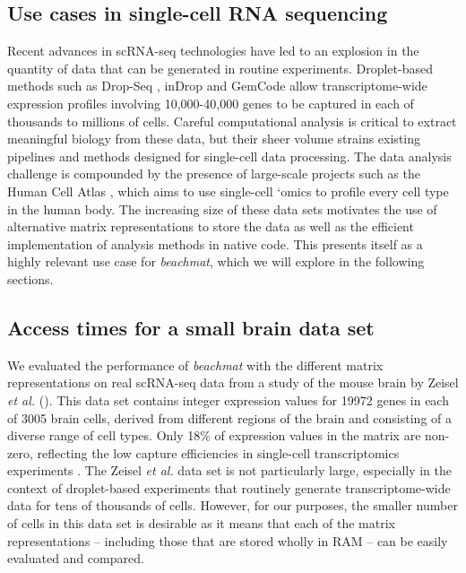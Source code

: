 \documentclass[10pt,letterpaper]{article}
\newcommand{\beachmat}{\textit{beachmat}}
\begin{document}
\subsection*{Use cases in single-cell RNA sequencing}
Recent advances in scRNA-seq technologies have led to an explosion in the quantity of data that can be generated in routine experiments.
Droplet-based methods such as Drop-Seq \cite{macosko2015highly}, inDrop \cite{klein2015droplet} and GemCode \cite{zheng2017massively} allow transcriptome-wide expression profiles involving 10,000-40,000 genes to be captured in each of thousands to millions of cells.
Careful computational analysis is critical to extract meaningful biology from these data, but their sheer volume strains existing pipelines and methods designed for single-cell data processing.
The data analysis challenge is compounded by the presence of large-scale projects such as the Human Cell Atlas \cite{regev2017human}, which aims to use single-cell `omics to profile every cell type in the human body.
The increasing size of these data sets motivates the use of alternative matrix representations to store the data as well as the efficient implementation of analysis methods in native code.
This presents itself as a highly relevant use case for \beachmat{}, which we will explore in the following sections.

\subsection*{Access times for a small brain data set}
We evaluated the performance of \beachmat{} with the different matrix representations on real scRNA-seq data from a study of the mouse brain by Zeisel \textit{et al.} \cite{zeisel2015brain} (\suppsecrealzeisel{}). 
This data set contains integer expression values for 19972 genes in each of 3005 brain cells, derived from different regions of the brain and consisting of a diverse range of cell types.
Only 18\% of expression values in the matrix are non-zero, reflecting the low capture efficiencies in single-cell transcriptomics experiments \cite{grun2015design}.
The Zeisel \textit{et al.} data set is not particularly large, especially in the context of droplet-based experiments that routinely generate transcriptome-wide data for tens of thousands of cells.
However, for our purposes, the smaller number of cells in this data set is desirable as it means that each of the matrix representations -- including those that are stored wholly in RAM -- can be easily evaluated and compared.
\end{document}
